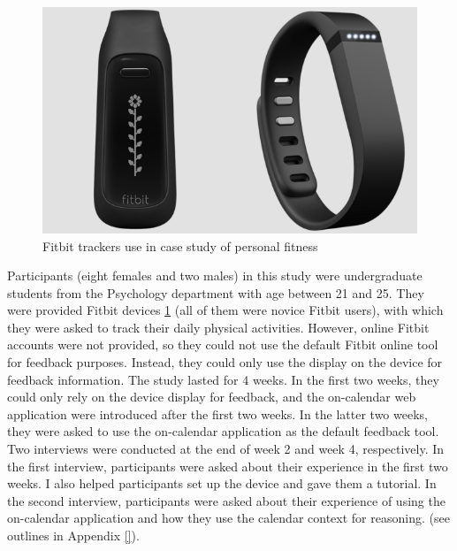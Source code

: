 \documentclass[12pt,oneside]{book}
\begin{document}
\begin{figure}[h]
\centering
\includegraphics[width=\columnwidth/2]{figures/fitbit_tracker}
\caption{Fitbit trackers use in case study of personal fitness }
\label{fig:fitbit}
\end{figure}

Participants (eight females and two males) in this study were undergraduate students from the Psychology department with age between 21 and 25. They were provided Fitbit devices \ref{fig:fitbit} (all of them were novice Fitbit users), with which they were asked to track their daily physical activities. However, online Fitbit accounts were not provided, so they could not use the default Fitbit online tool for feedback purposes. Instead, they could only use the display on the device for feedback information. The study lasted for 4 weeks. In the first two weeks, they could only rely on the device display for feedback, and the on-calendar web application were introduced after the first two weeks. In the latter two weeks, they were asked to use the on-calendar application as the default feedback tool. Two interviews were conducted at the end of week 2 and week 4, respectively. In the first interview, participants were asked about their experience in the first two weeks. I also helped participants set up the device and gave them a tutorial. In the second interview, participants were asked about their experience of using the on-calendar application and how they use the calendar context for reasoning. (see outlines in Appendix \ref{}).
\end{document}
